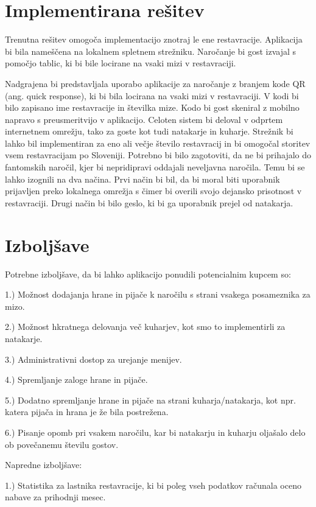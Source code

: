 \documentclass[a4paper, 12pt]{book}
\begin{document}
\section{Implementirana rešitev}

Trenutna rešitev omogoča implementacijo znotraj le ene restavracije. Aplikacija bi bila nameščena na lokalnem spletnem strežniku. Naročanje bi gost izvajal s pomočjo tablic, ki bi bile locirane na vsaki mizi v restavraciji. 

Nadgrajena bi predstavljala uporabo aplikacije za naročanje z branjem kode QR (ang. quick response), ki bi bila locirana na vsaki mizi v restavraciji. V kodi bi bilo zapisano ime restavracije in številka mize. Kodo bi gost skeniral z mobilno napravo s preusmeritvijo v aplikacijo. Celoten sistem bi deloval v odprtem internetnem omrežju, tako za goste kot tudi natakarje in kuharje. Strežnik bi lahko bil implementiran za eno ali večje število restavracij in bi omogočal storitev vsem restavracijam po Sloveniji. Potrebno bi bilo zagotoviti, da ne bi prihajalo do fantomskih naročil, kjer bi nepridipravi oddajali neveljavna naročila. Temu bi se lahko izognili na dva načina. Prvi način bi bil, da bi moral biti uporabnik prijavljen preko lokalnega omrežja s čimer bi overili svojo dejansko prisotnost v restavraciji.
Drugi način bi bilo geslo, ki bi ga uporabnik prejel od natakarja. 


\section{Izboljšave}

Potrebne izboljšave, da bi lahko aplikacijo ponudili potencialnim kupcem so:

1.) Možnost dodajanja hrane in pijače k naročilu s strani vsakega posameznika za mizo.

2.) Možnost hkratnega delovanja več kuharjev, kot smo to implementirli za natakarje.

3.) Administrativni dostop za urejanje menijev.

4.) Spremljanje zaloge hrane in pijače.

5.) Dodatno spremljanje hrane in pijače na strani kuharja/natakarja, kot npr. katera pijača in hrana je že bila postrežena.

6.) Pisanje opomb pri vsakem naročilu, kar bi natakarju in kuharju oljašalo delo ob povečanemu številu gostov.


Napredne izboljšave: 

1.) Statistika za lastnika restavracije, ki bi poleg vseh podatkov računala oceno nabave za prihodnji mesec.
\end{document}
